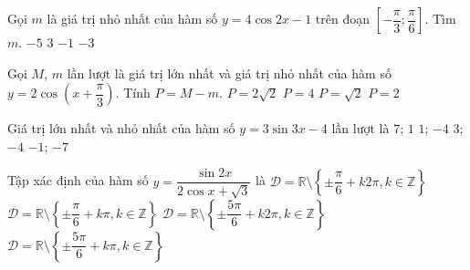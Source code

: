 \begin{ex}%
	Gọi $m$ là giá trị nhỏ nhất của hàm  số $y=4\cos 2x-1$ trên đoạn $\left[-\dfrac{\pi}{3};\dfrac{\pi}{6}\right]$. Tìm $m$.
	\choice 
		 {$-5$}
		{$3$} 
		{$-1$} 
		 {\True $-3$}
\end{ex}

\begin{ex}%
	Gọi $M$, $m$ lần lượt là giá trị lớn nhất và giá trị nhỏ nhất của  hàm số $y=2\cos\left(x+\dfrac{\pi}{3}\right)$. Tính $P=M-m$.
	 \choice
		 {$P=2\sqrt{2}$}
		{\True $P=4$} 
		{$P=\sqrt{2}$} 
		{$P=2$} 
\end{ex}

\begin{ex}%
	Giá trị lớn nhất và nhỏ nhất của hàm  số $y=3\sin 3x-4$ lần lượt là
	\choice 
		 {$7$; $1$}
		{$1$;  $-4$}
		{$3$; $-4$} 
		 {\True $-1$; $-7$}
\end{ex}

\begin{ex}%
	Tập xác  định của hàm số $y=\dfrac{\sin 2x}{2\cos x+\sqrt{3}}$ là
	\choice 
		{$\mathscr{D}=\mathbb{R}\setminus \left\{ \pm \dfrac{\pi }{6}+k2\pi  ,k\in \mathbb{Z} \right\}$}
		{$\mathscr{D}=\mathbb{R}\setminus \left\{ \pm \dfrac{\pi  }{6}+k\pi ,k\in \mathbb{Z} \right\}$}
		{\True $\mathscr{D}=\mathbb{R}\setminus \left\{ \pm \dfrac{5\pi }{6}+k2\pi ,k\in \mathbb{Z} \right\}$} 
		{$\mathscr{D}=\mathbb{R}\setminus \left\{ \pm \dfrac{5\pi }{6}+k\pi  ,k\in \mathbb{Z} \right\}$}
\end{ex}

